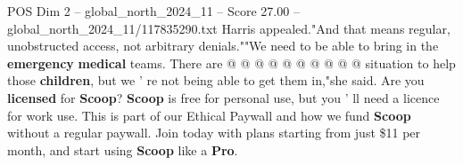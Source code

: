 \begin{textsample}{POS Dim 2 – global\_north\_2024\_11 – Score 27.00 – global\_north\_2024\_11/117835290.txt}
Harris appealed."And that means regular, unobstructed access, not arbitrary denials.""We need to be able to bring in the \textbf{emergency} \textbf{medical} teams.
There are @ @ @ @ @ @ @ @ @ @ situation to help those \textbf{children}, but we ' re not being able to get them in,"she said.
Are you \textbf{licensed} for \textbf{Scoop}? \textbf{Scoop} is free for personal use, but you ' ll need a licence for work use.
This is part of our Ethical Paywall and how we fund \textbf{Scoop} without a regular paywall.
Join today with plans starting from just \$11 per month, and start using \textbf{Scoop} like a \textbf{Pro}.

\end{textsample}
